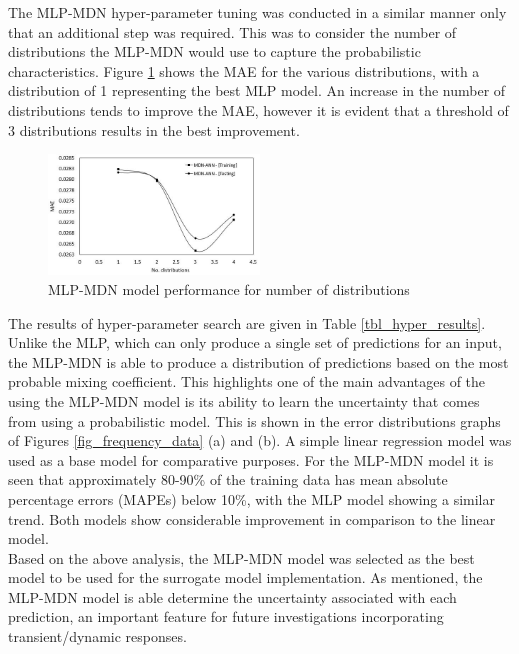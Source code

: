 \documentclass[a4paper,fleqn]{cas-dc}
\begin{document}
The MLP-MDN hyper-parameter tuning was conducted in a similar manner only that an additional step was required. This was to consider the number of distributions the MLP-MDN would use to capture the probabilistic characteristics. Figure \ref{fig_mdn_hyper} shows the MAE for the various distributions, with a distribution of 1 representing the best MLP model. An increase in the number of distributions tends to improve the MAE, however it is evident that a threshold of 3 distributions results in the best improvement.\\
\begin{figure}[h!]
	\centering
		\includegraphics[width=0.5\textwidth]{DIST_HYPER}
	  \caption{MLP-MDN model performance for number of distributions}\label{fig_mdn_hyper}
\end{figure}

The results of hyper-parameter search are given in Table \ref{tbl_hyper_results}. Unlike the MLP, which can only produce a single set of predictions for an input, the MLP-MDN is able to produce a distribution of predictions based on the most probable mixing coefficient. This highlights one of the main advantages of the using the MLP-MDN model is its ability to learn the uncertainty that comes from using a probabilistic model. This is shown in the error distributions graphs of Figures \ref{fig_frequency_data} (a) and (b). A simple linear regression model was used as a base model for comparative purposes. For the MLP-MDN model it is seen that approximately 80-90\% of the training data has mean absolute percentage errors (MAPEs) below 10\%, with the MLP model showing a similar trend. Both models show considerable improvement in comparison to the linear model.\\

Based on the above analysis, the MLP-MDN model was selected as the best model to be used for the surrogate model implementation. As mentioned, the MLP-MDN model is able determine the uncertainty associated with each prediction, an important feature for future investigations incorporating transient/dynamic responses.
\end{document}
